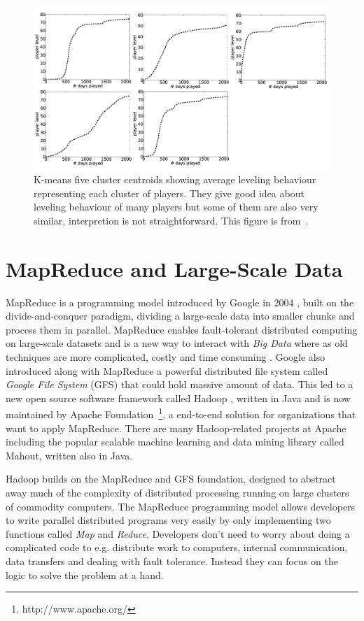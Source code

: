 \begin{figure}[here]
\centerline{\includegraphics[width=1.0\textwidth]{Figures/kmeansbasis.png}}
\caption{K-means five cluster centroids showing average leveling behaviour representing each cluster of players. They give good idea about leveling behaviour of many players but some of them are also very similar, interpretion is not straightforward. This figure is from~\citep{Drachen:2013}. }
\label{fig:kmeansbasis}
\end{figure}


\section{MapReduce and Large-Scale Data}
\label{sec:MRLargeData}
MapReduce is a programming model introduced by Google in 2004 \citep{Dean:2004}, built on the divide-and-conquer paradigm, dividing a large-scale data into smaller chunks and process them in parallel. MapReduce enables fault-tolerant distributed computing on large-scale datasets and is a new way to interact with \textit{Big Data} where as old techniques are more complicated, costly and time consuming \citep{Dean:2004, schneider2012Hadoop}. Google also introduced along with MapReduce a powerful distributed file system called \textit{Google File System} (GFS) that could hold massive amount of data. This led to a new open source software framework called Hadoop \citep{bialecki2005hadoop}, written in Java and is now maintained by Apache Foundation~\footnote{http://www.apache.org/}, a end-to-end solution for organizations that want to apply MapReduce. There are many Hadoop-related projects at Apache including the popular scalable machine learning and data mining library called Mahout, written also in Java. 

Hadoop builds on the MapReduce and GFS foundation, designed to abstract away much of the complexity of distributed processing running on large clusters of commodity computers. The MapReduce programming model allows developers to write parallel distributed programs very easily by only implementing two functions called \textit{Map} and \textit{Reduce}. Developers don't need to worry about doing a complicated code to e.g. distribute work to computers, internal communication, data transfers and dealing with fault tolerance. Instead they can focus on the logic to solve the problem at a hand.

